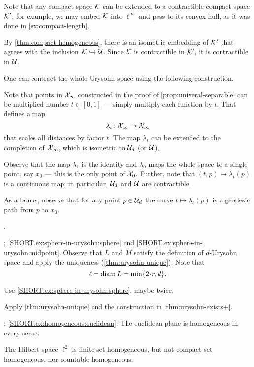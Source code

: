 Note that any compact space $\mathcal{K}$ can be extended to a contractible compact space $\mathcal{K}'$; for example, we may embed $\mathcal{K}$ into $\ell^\infty$ and pass to its convex hull, as it was done in \ref{ex:compact-length}.

By \ref{thm:compact-homogeneous}, there is an isometric embedding of $\mathcal{K}'$ that agrees with the inclusion $\mathcal{K}\hookrightarrow\mathcal{U}$.
Since $\mathcal{K}$ is contractible in $\mathcal{K}'$, it is contractible in $\mathcal{U}$.

One can contract the whole Urysohn space using the following construction.

Note that points in $\mathcal{X}_\infty$ constructed in the proof of \ref{prop:univeral-separable} can be multiplied number $t\in [0,1]$ --- simply multiply each function by $t$.
That defines a map 
\[\lambda_t\colon\mathcal{X}_\infty\to \mathcal{X}_\infty\]
that scales all distances by factor $t$.
The map $\lambda_t$ can be extended to the completion of $\mathcal{X}_\infty$, which is isometric to $\mathcal{U}_d$ (or $\mathcal{U}$).

Observe that 
the map $\lambda_1$ is the identity  and $\lambda_0$ maps the whole space to a single point, say $x_0$ --- this is the only point of $\mathcal{X}_0$.
Further, note that $(t,p)\mapsto \lambda_t(p)$ is a continuous map; in particular, $\mathcal{U}_d$ and $\mathcal{U}$ are contractible.

As a bonus, observe that for any point $p\in \mathcal{U}_d$ the curve $t\mapsto \lambda_t(p)$ is a geodesic path from $p$ to $x_0$.

 \cite[$\text{(d)}$ on page 82]{gromov-2007}.

\parbf{\ref{ex:sphere-in-urysohn}}; \ref{SHORT.ex:sphere-in-urysohn:sphere} and \ref{SHORT.ex:sphere-in-urysohn:midpoint}.
Observe that $L$ and $M$ satisfy the definition of $d$-Urysohn space and apply the uniqueness (\ref{thm:urysohn-unique}).
Note that
\[\ell=\diam L=\min\{2\cdot r, d\}.\]

Use \ref{SHORT.ex:sphere-in-urysohn:sphere}, maybe twice.

Apply \ref{thm:urysohn-unique} and the construction in \ref{thm:urysohn-exists+}.

\parbf{\ref{ex:homogeneous}}; \ref{SHORT.ex:homogeneous:euclidean}.
The euclidean plane is homogeneous in every sense.

 The Hilbert space $\ell^2$ is finite-set homogeneous, but not compact set homogeneous, nor countable homogeneous.

